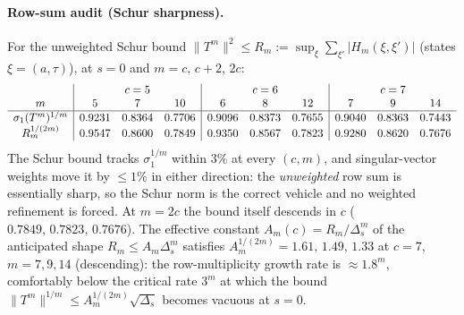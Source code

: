 \documentclass[11pt]{article}
\theoremstyle{plain}
\theoremstyle{definition}
\theoremstyle{remark}
\begin{document}
\paragraph{Row-sum audit (Schur sharpness).} For the unweighted Schur bound
$\lVert T^m\rVert^2\le R_m:=\sup_{\xi}\sum_{\xi'}\lvert H_m(\xi,\xi')\rvert$
(states $\xi=(a,\tau)$), at $s=0$ and $m=c,\,c+2,\,2c$:
\[
\begin{array}{c|ccc|ccc|ccc}
& \multicolumn{3}{c|}{c=5} & \multicolumn{3}{c|}{c=6}
& \multicolumn{3}{c}{c=7}\\
m & 5 & 7 & 10 & 6 & 8 & 12 & 7 & 9 & 14\\\hline
\sigma_1(T^m)^{1/m} & 0.9231 & 0.8364 & 0.7706
                    & 0.9096 & 0.8373 & 0.7655
                    & 0.9040 & 0.8363 & 0.7443\\
R_m^{1/(2m)}        & 0.9547 & 0.8600 & 0.7849
                    & 0.9350 & 0.8567 & 0.7823
                    & 0.9280 & 0.8620 & 0.7676
\end{array}
\]
The Schur bound tracks $\sigma_1^{1/m}$ within $3\%$ at every $(c,m)$, and
singular-vector weights move it by $\le1\%$ in either direction: the
\emph{unweighted} row sum is essentially sharp, so the Schur norm is the
correct vehicle and no weighted refinement is forced. At $m=2c$ the bound
itself descends in $c$ ($0.7849,\,0.7823,\,0.7676$). The effective constant
$A_m(c)=R_m/\Delta_s^m$ of the anticipated shape $R_m\le A_m\Delta_s^m$
satisfies $A_m^{1/(2m)}=1.61,\,1.49,\,1.33$ at $c=7$, $m=7,9,14$
(descending): the row-multiplicity growth rate is $\approx1.8^m$, comfortably
below the critical rate $3^m$ at which the bound
$\lVert T^m\rVert^{1/m}\le A_m^{1/(2m)}\sqrt{\Delta_s}$ becomes vacuous at
$s=0$.
\end{document}
